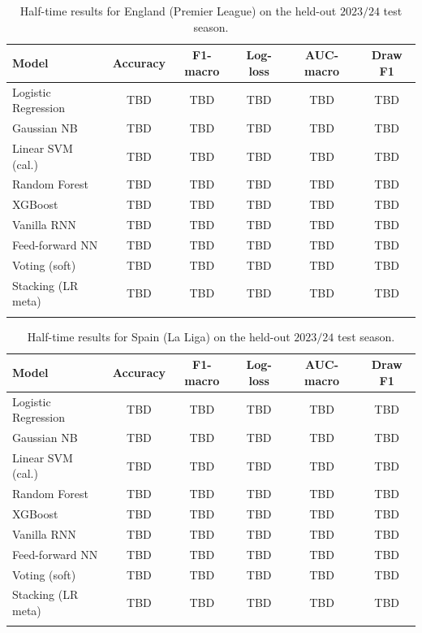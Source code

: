 \documentclass[pdflatex,sn-mathphys-num]{sn-jnl}
\theoremstyle{thmstyleone}
\theoremstyle{thmstyletwo}
\theoremstyle{thmstylethree}
\begin{document}
\begin{table}[h]
\caption{Half-time results for England (Premier League) on the
held-out $2023/24$ test season.}\label{tab:ht-eng}
\begin{tabular}{@{}lccccc@{}}
\toprule
Model               & Accuracy & F1-macro & Log-loss & AUC-macro & Draw F1 \\
\midrule
Logistic Regression & TBD & TBD & TBD & TBD & TBD \\
Gaussian NB         & TBD & TBD & TBD & TBD & TBD \\
Linear SVM (cal.)   & TBD & TBD & TBD & TBD & TBD \\
Random Forest       & TBD & TBD & TBD & TBD & TBD \\
XGBoost             & TBD & TBD & TBD & TBD & TBD \\
Vanilla RNN         & TBD & TBD & TBD & TBD & TBD \\
Feed-forward NN     & TBD & TBD & TBD & TBD & TBD \\
\midrule
Voting (soft)       & TBD & TBD & TBD & TBD & TBD \\
Stacking (LR meta)  & TBD & TBD & TBD & TBD & TBD \\
\botrule
\end{tabular}
\end{table}

\begin{table}[h]
\caption{Half-time results for Spain (La Liga) on the held-out
$2023/24$ test season.}\label{tab:ht-esp}
\begin{tabular}{@{}lccccc@{}}
\toprule
Model               & Accuracy & F1-macro & Log-loss & AUC-macro & Draw F1 \\
\midrule
Logistic Regression & TBD & TBD & TBD & TBD & TBD \\
Gaussian NB         & TBD & TBD & TBD & TBD & TBD \\
Linear SVM (cal.)   & TBD & TBD & TBD & TBD & TBD \\
Random Forest       & TBD & TBD & TBD & TBD & TBD \\
XGBoost             & TBD & TBD & TBD & TBD & TBD \\
Vanilla RNN         & TBD & TBD & TBD & TBD & TBD \\
Feed-forward NN     & TBD & TBD & TBD & TBD & TBD \\
\midrule
Voting (soft)       & TBD & TBD & TBD & TBD & TBD \\
Stacking (LR meta)  & TBD & TBD & TBD & TBD & TBD \\
\botrule
\end{tabular}
\end{table}
\end{document}
